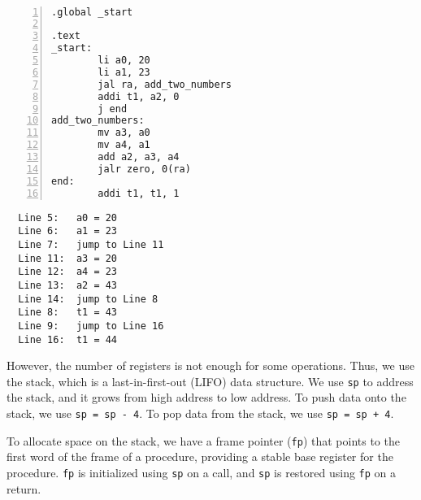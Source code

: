 \begin{eg}~

\begin{minipage}{0.5\textwidth}
\begin{Verbatim}[numbers=left,xleftmargin=5mm]
.global _start

.text
_start:
        li a0, 20
        li a1, 23
        jal ra, add_two_numbers 
        addi t1, a2, 0
        j end 
add_two_numbers:
        mv a3, a0
        mv a4, a1
        add a2, a3, a4
        jalr zero, 0(ra)
end:    
        addi t1, t1, 1
\end{Verbatim}
\end{minipage}
\begin{minipage}{0.5\textwidth}
\color{red}
\begin{verbatim}
  Line 5:   a0 = 20
  Line 6:   a1 = 23
  Line 7:   jump to Line 11
  Line 11:  a3 = 20
  Line 12:  a4 = 23
  Line 13:  a2 = 43
  Line 14:  jump to Line 8
  Line 8:   t1 = 43
  Line 9:   jump to Line 16
  Line 16:  t1 = 44
\end{verbatim}
\end{minipage}
\end{eg}

However, the number of registers is not enough for some operations. Thus, we use the stack, which is a last-in-first-out (LIFO) data structure. We use \verb|sp| to address the stack, and it grows from high address to low address. To push data onto the stack, we use \verb|sp = sp - 4|. To pop data from the stack, we use \verb|sp = sp + 4|. 

To allocate space on the stack, we have a frame pointer (\verb|fp|) that points to the first word of the frame of a procedure, providing a stable base register for the procedure. \verb|fp| is initialized using \verb|sp| on a call, and \verb|sp| is restored using \verb|fp| on a return.

